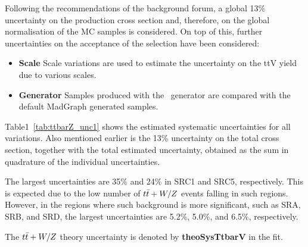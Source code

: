 \begin{description}
  Following the recommendations of the background forum, a global 13\% uncertainty on the production cross section and, therefore, on the global normalisation of the MC samples is considered. On top of this, further uncertainties on the acceptance of the selection have been considered:

  \begin{itemize}
  \item{\bf Scale} Scale variations are used to estimate the uncertainty on the ttV yield due to various scales. 
  \item{\bf Generator} Samples produced with the \sherpa\ generator are compared with the default MadGraph generated samples.
  \end{itemize}
  Table1~\ref{tab:ttbarZ_unc1} shows the estimated systematic uncertainties for all variations. Also mentioned earlier is the 13\% uncertainty on the total cross section, together with the total estimated uncertainty, obtained as the sum in quadrature of the individual uncertainties.

  The largest uncertainties are 35\% and 24\% in SRC1 and SRC5, respectively. This is expected due to the low number of $t\bar{t}+W/Z$ events falling in such regions. However, in the regions where such background is more significant, such as SRA, SRB, and SRD, the largest uncertainties are 5.2\%, 5.0\%, and 6.5\%, respectively.
  
  The $t\bar{t}+W/Z$ theory uncertainty is denoted by {\bf theoSysTtbarV} in the fit.

      

  



\end{description}
